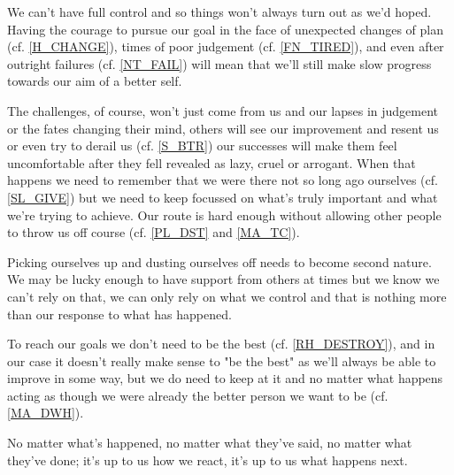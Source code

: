 \cleardoublepage
\begin{multicols}{2}

We can't have full control and so things won't always turn out as we'd hoped. Having the courage to pursue our goal in the face of unexpected changes of plan (cf. \ref{H_CHANGE}), times of poor judgement (cf. \ref{FN_TIRED}), and even after outright failures (cf. \ref{NT_FAIL}) will mean that we'll still make slow progress towards our aim of a better self. 

The challenges, of course, won't just come from us and our lapses in judgement or the fates changing their mind, others will see our improvement and resent us or even try to derail us (cf. \ref{S_BTR}) our successes will make them feel uncomfortable after they fell revealed as lazy, cruel or arrogant. When that happens we need to remember that we were there not so long ago ourselves (cf. \ref{SL_GIVE}) but we need to keep focussed on what's truly important and what we're trying to achieve. Our route is hard enough without allowing other people to throw us off course (cf. \ref{PL_DST} and \ref{MA_TC}).

Picking ourselves up and dusting ourselves off needs to become second nature. We may be lucky enough to have support from others at times but we know we can't rely on that, we can only rely on what we control and that is nothing more than our response to what has happened.

To reach our goals we don't need to be the best (cf. \ref{RH_DESTROY}), and in our case it doesn't really make sense to "be the best" as we'll always be able to improve in some way, but we do need to keep at it and no matter what happens acting as though we were already the better person we want to be (cf. \ref{MA_DWH}).

No matter what's happened, no matter what they've said, no matter what they've done; it's up to us how we react, it's up to us what happens next.

\end{multicols}
\clearpage
